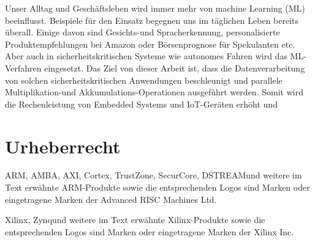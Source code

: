 Unser Alltag und Geschäftsleben wird immer mehr von machine Learning (ML) beeinflusst. Beispiele für den Einsatz begegnen uns im täglichen Leben bereits überall. Einige davon sind Gesichts-und Spracherkennung, personalisierte Produktempfehlungen bei Amazon oder Börsenprognose für Spekulanten etc. Aber auch in sicherheitskritischen Systeme wie autonomes Fahren wird das ML-Verfahren eingesetzt. Das Ziel von dieser Arbeit ist, dass die Datenverarbeitung von solchen sicherheitskritischen Anwendungen beschleunigt  und parallele Multiplikation-und Akkumulations-Operationen ausgeführt werden. Somit wird die Rechenleistung von Embedded Systems und IoT-Geräten erhöht und 


\cleardoublepage

\chapter*{Urheberrecht}

ARM\TReg, AMBA\TReg, AXI\TTra, Cortex\TTra, TrustZone\TTra, SecurCore\TTra  , DSTREAM\TTra und weitere im Text erwähnte ARM-Produkte sowie die entsprechenden Logos sind Marken oder eingetragene Marken der Advanced RISC Machines Ltd.\par
\vspace{0.5cm}
Xilinx\TReg, Zynq\TTra und weitere im Text erwähnte Xilinx-Produkte sowie die entsprechenden Logos sind Marken oder eingetragene Marken der Xilinx Inc.\par
\vspace{0.5cm}